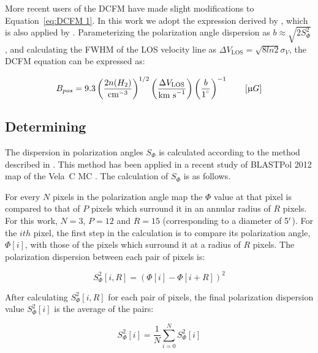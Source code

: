 More recent users of the DCFM have made slight modifications to Equation~\ref{eq:DCFM 1}. In this work we adopt the expression derived by \citet{hildebrand2009dispersion}, which is also applied by \citet{crutcher2004scuba,franco2015tracing}. Parameterizing the polarization angle dispersion as $b \approx \sqrt{2 S^{2}_{\Phi}}$ \citep{houde2009dispersion}, and calculating the FWHM of the LOS velocity line as $\Delta V_{\mathrm{LOS}} = \sqrt{8 ln 2} \sigma_{V}$, the DCFM equation can be expressed as:

 \begin{equation}\label{eq:DCFM 2}
    B_{pos} = 9.3 \left( \frac{2n(H_{2})}{\text{cm}^{-3}}  \right)^{1/2} \left( \frac{\Delta V_{\mathrm{LOS}}}{\text{km s}^{-1}} \right)  \left(  \frac{b}{1^{\degree}}\right)^{-1} \qquad \left[ \upmu G \right]
 \end{equation}

\subsection{Determining }\label{pol disp}

The dispersion in polarization angles $S_{\Phi}$ is calculated according to the method described in \citet{ade2015planck}. This method has been applied in a recent study of BLASTPol 2012 map of the Vela~C MC \citep{fissel2016balloon}. The calculation of $S_{\Phi}$ is as follows.

For every $N$ pixels in the polarization angle map the $\Phi$ value at that pixel is compared to that of $P$ pixels which surround it in an annular radius of $R$ pixels. For this work, $N = 3$, $P = 12$ and $R = 15$ (corresponding to a diameter of 5$\operatorname{^{\prime}}$). For the $ith$ pixel, the first step in the calculation is to compare its polarization angle, $\Phi[i]$, with those of the pixels which surround it at a radius of $R$ pixels. The polarization dispersion between each pair of pixels is:

\begin{equation}
  S^{2}_{\Phi}[i,R] = \left( \Phi[i] - \Phi[i + R] \right)^{2}
\end{equation}

After calculating $S^{2}_{\Phi}[i,R]$ for each pair of pixels, the final polarization dispersion value $S^{2}_{\Phi}[i]$ is the average of the pairs:

\begin{equation}
  S^{2}_{\Phi}[i] = \frac{1}{N} \sum\limits_{i=0}^{N} S^{2}_{\Phi}[i]
\end{equation}

